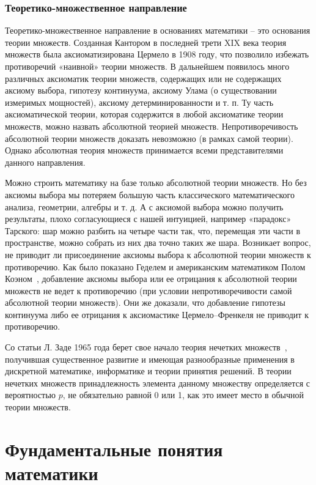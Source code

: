 \subsubsection{Теоретико-множественное направление}

Теоретико-множественное направление в основаниях математики – это основания теории множеств. Созданная Кантором в последней трети XIX века теория множеств была аксиоматизирована Цермело в 1908 году, что позволило избежать противоречий «наивной» теории множеств. В дальнейшем появилось много различных аксиоматик теории множеств, содержащих или не содержащих аксиому выбора, гипотезу континуума, аксиому Улама (о существовании измеримых мощностей), аксиому детерминированности и т. п. Ту часть аксиоматической теории, которая содержится в любой аксиоматике теории множеств, можно назвать абсолютной теорией множеств. Непротиворечивость абсолютной теории множеств доказать невозможно (в рамках самой теории). Однако абсолютная теория множеств принимается всеми представителями данного направления. 

Можно строить математику на базе только абсолютной теории множеств. Но без аксиомы выбора мы потеряем большую часть классического математического анализа, геометрии, алгебры и т. д. А с аксиомой выбора можно получить результаты, плохо согласующиеся с нашей интуицией, например «парадокс» Тарского: шар можно разбить на четыре части так, что, перемещая эти части в пространстве, можно собрать из них два точно таких же шара. Возникает вопрос, не приводит ли присоединение аксиомы выбора к абсолютной теории множеств к противоречию. Как было показано Геделем и американским математиком Полом Коэном~\cite{ph281}, добавление аксиомы выбора или ее отрицания к абсолютной теории множеств не ведет к противоречию (при условии непротиворечивости самой абсолютной теории множеств). Они же доказали, что добавление гипотезы континуума либо ее отрицания к аксиомастике Цермело–Френкеля не приводит к противоречию. 

Со статьи Л. Заде 1965 года берет свое начало теория нечетких множеств~\cite{ph280}, получившая существенное развитие и имеющая разнообразные применения в дискретной математике, информатике и теории принятия решений. В теории нечетких множеств принадлежность элемента данному множеству определяется с вероятностью $p$, не обязательно равной 0 или 1, как это имеет место в обычной теории множеств.

\section{Фундаментальные понятия математики}

